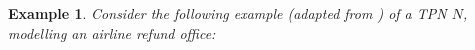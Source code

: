 \documentclass[conference]{IEEEtran}
\newcommand\eye{\ensurestackMath{\stackinset{c}{}{c}{-.33pt}%
		{\bullet}{\bigcirc}}}
\newtheorem{example}{Example}
\begin{document}
\begin{example}\label{TPN}
	Consider the following example (adapted from \cite{AS21}) of a TPN $N$, modelling an airline refund office: \\
		\adjustbox{scale = 0.6}{

}
\end{example}
\end{document}

